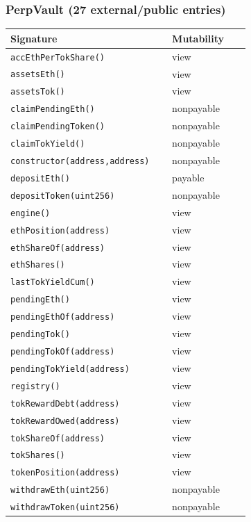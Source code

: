 \subsubsection*{PerpVault \;\normalfont\small(27 external/public entries)}
\begin{longtable}{@{}p{0.62\linewidth}p{0.30\linewidth}@{}}
\toprule \textbf{Signature} & \textbf{Mutability} \\ \midrule \endhead
\texttt{\scriptsize accEthPerTokShare()} & view \\
\texttt{\scriptsize assetsEth()} & view \\
\texttt{\scriptsize assetsTok()} & view \\
\texttt{\scriptsize claimPendingEth()} & nonpayable \\
\texttt{\scriptsize claimPendingToken()} & nonpayable \\
\texttt{\scriptsize claimTokYield()} & nonpayable \\
\texttt{\scriptsize constructor(address,address)} & nonpayable \\
\texttt{\scriptsize depositEth()} & payable \\
\texttt{\scriptsize depositToken(uint256)} & nonpayable \\
\texttt{\scriptsize engine()} & view \\
\texttt{\scriptsize ethPosition(address)} & view \\
\texttt{\scriptsize ethShareOf(address)} & view \\
\texttt{\scriptsize ethShares()} & view \\
\texttt{\scriptsize lastTokYieldCum()} & view \\
\texttt{\scriptsize pendingEth()} & view \\
\texttt{\scriptsize pendingEthOf(address)} & view \\
\texttt{\scriptsize pendingTok()} & view \\
\texttt{\scriptsize pendingTokOf(address)} & view \\
\texttt{\scriptsize pendingTokYield(address)} & view \\
\texttt{\scriptsize registry()} & view \\
\texttt{\scriptsize tokRewardDebt(address)} & view \\
\texttt{\scriptsize tokRewardOwed(address)} & view \\
\texttt{\scriptsize tokShareOf(address)} & view \\
\texttt{\scriptsize tokShares()} & view \\
\texttt{\scriptsize tokenPosition(address)} & view \\
\texttt{\scriptsize withdrawEth(uint256)} & nonpayable \\
\texttt{\scriptsize withdrawToken(uint256)} & nonpayable \\
\bottomrule\end{longtable}

